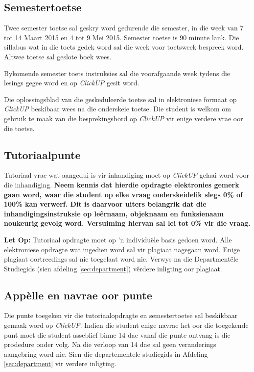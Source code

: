     \subsection{Semestertoetse}
        Twee semester toetse sal geskry word gedurende die semester, in die
        week van 7 tot 14 Maart 2015 en 4 tot 9 Mei 2015. Semester toetse is
        90 minute lank.  Die sillabus wat in die toets gedek word sal die week
        voor toetsweek bespreek word.  Altwee toetse sal geslote boek wees.

        Bykomende semester toets instruksies sal die voorafgaande week tydens
        die lesings gegee word en op \textit{ClickUP} gesit word.

        Die oplossingsblad van die geskeduleerde toetse sal in elektroniese
        formaat op \textit{ClickUP} beskibaar wees na die onderskeie toetse.
        Die student is welkom om gebruik te maak van die besprekingsbord op
        \textit{ClickUP} vir enige verdere vrae oor die toetse.

    \subsection{Tutoriaalpunte} \label{sec:tutoriaal}
        Tutoriaal vrae wat aangedui is vir inhandiging moet op \textit{ClickUP}
        gelaai word voor die inhandiging. \textbf{Neem kennis dat hierdie
        opdragte elektronies gemerk gaan word, waar die student op elke
        vraag onderskeidelik slegs 0\% of 100\% kan verwerf. Dit is
        daarvoor uiters belangrik dat die inhandigingsinstruksie op
        le\^ernaam, objeknaam en funksienaam noukeurig gevolg word.
        Versuiming hiervan sal lei tot 0\% vir die vraag.}

        \textbf{Let Op:} Tutoriaal opdragte moet op 'n individu\"ele basis
        gedoen word. Alle elektroniese opdragte wat ingedien word sal vir
        plagiaat nagegaan word. Enige plagiaat oortreedings sal nie toegelaat
        word nie.  Verwys na die Department\"ele Studiegids (sien afdeling
        \ref{sec:department}) v\^erdere inligting oor plagiaat.

    \subsection{App\`{e}lle en navrae oor punte}
        Die punte toegeken vir die tutoriaalopdragte en semestertoetse sal
        beskikbaar gemaak word op \textit{ClickUP}. Indien die student enige
        navrae het oor die toegekende punt moet die student asseblief binne 14
        dae vanaf die punte ontvang is die prodedure onder volg.  Na die
        verloop van 14 dae sal geen veranderings aangebring word nie. Sien die
        departementele studiegids in Afdeling \ref{sec:department} vir verdere
        inligting.

